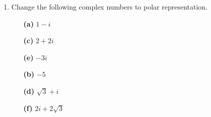 {\begin{enumerate}
\begin{minipage}[t]{4.6in}
\begin{minipage}[t]{2.25in}
\begin{itemize}
 \item[{\bf (c)}]
$3 \cis(\pi)$
 
\end{itemize}
\end{minipage} \hfill
\begin{minipage}[t]{2.25in}
\begin{itemize}
 
 \item[{\bf (b)}]
$5 \cis(9\pi/4)$
 
 \item[{\bf (d)}]
$\cis(7\pi/4) /2$
 
\end{itemize}
\end{minipage}
\end{minipage}
 
\vspace{2pt}        %
 
 
\bf\item\rm	  %
Change the following complex numbers to polar representation.
 
 
\vspace{3pt}        %
 
\hspace{-7pt}
\begin{minipage}[t]{4.6in}
\noindent
\begin{minipage}[t]{2.25in}
\begin{itemize}
 
 \item[{\bf (a)}]
$1-i$
 
 \item[{\bf (c)}]
$2+2i$
 
 \item[{\bf (e)}]
$-3i$
 
\end{itemize}
\end{minipage} \hfill
\begin{minipage}[t]{2.25in}
\begin{itemize}
 
 \item[{\bf (b)}]
$-5$
 
 \item[{\bf (d)}]
$\sqrt{3} + i$
 
 \item[{\bf (f)}]
$2i + 2 \sqrt{3}$
 
\end{itemize}
\end{minipage}
\end{minipage}
 

\end{enumerate}}
